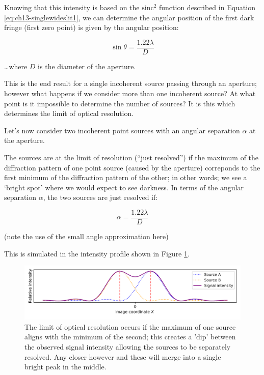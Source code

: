 \documentclass[
]{book}
\begin{document}
Knowing that this intensity is based on the \(\mathrm{sinc}^2\) function described in Equation \eqref{eq:ch13-singlewideslit1}, we can determine the angular position of the first dark fringe (first zero point) is given by the angular position:

\begin{equation}
\sin \theta = \frac{1.22 \lambda}{D}
\end{equation}

\ldots where \(D\) is the diameter of the aperture.

This is the end result for a single incoherent source passing through an aperture; however what happens if we consider more than one incoherent source? At what point is it impossible to determine the number of sources? It is this which determines the limit of optical resolution.

Let's now consider two incoherent point sources with an angular separation \(\alpha\) at the aperture.

The sources are at the limit of resolution (``just resolved'') if the maximum of the diffraction pattern of one point source (caused by the aperture) correponds to the first minimum of the diffraction pattern of the other; in other words; we see a `bright spot' where we would expect to see darkness. In terms of the angular separation \(\alpha\), the two sources are just resolved if:

\begin{equation}
\alpha = \frac{1.22 \lambda}{D}
\end{equation}

(note the use of the small angle approximation here)

This is simulated in the intensity profile shown in Figure \ref{fig:ch13-opticalreslimit1}.

\begin{figure}

{\centering \includegraphics[width=0.7\linewidth]{visualisations/ch13-opticalresolutionlimit1} 

}

\caption{The limit of optical resolution occurs if the maximum of one source aligns with the minimum of the second; this creates a 'dip' between the observed signal intensity allowing the sources to be separately resolved. Any closer however and these will merge into a single bright peak in the middle.}\label{fig:ch13-opticalreslimit1}
\end{figure}
\end{document}
